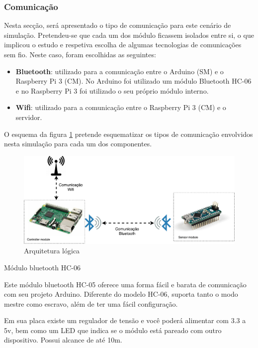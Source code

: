 \newpage
\subsubsection{Comunicação}

Nesta secção, será apresentado o tipo de comunicação para este cenário de simulação. Pretendeu-se que cada um dos módulo ficassem isolados entre si, o que implicou o estudo e respetiva escolha de algumas tecnologias de comunicações sem fio. Neste caso, foram escolhidas as seguintes: 

\begin{itemize}
	\item \textbf{Bluetooth}: utilizado para a comunicação entre o Arduino (\ac{SM}) e o Raspberry Pi 3 (\ac{CM}). No Arduino foi utilizado um módulo Bluetooth HC-06 e no Raspberry Pi 3 foi utilizado o seu próprio módulo interno. 
	\item \textbf{Wifi}: utilizado para a comunicação entre o Raspberry Pi 3 (\ac{CM}) e o servidor. 
\end{itemize}


O esquema da figura \ref{esquemcomm} pretende esquematizar os tipos de comunicação envolvidos nesta simulação para cada um dos componentes. 

\begin{figure}[!htb]
	\centering
	\includegraphics[width=\linewidth]{img/comm-blue/HW-geral.pdf}
	\caption{Arquitetura lógica}
	\label{esquemcomm}
\end{figure}




Módulo bluetooth HC-06



Este módulo bluetooth HC-05 oferece uma forma fácil e barata de comunicação com seu projeto Arduino. Diferente do modelo HC-06, suporta tanto o modo mestre como escravo, além de ter uma fácil configuração.

Em sua placa existe um regulador de tensão e você poderá alimentar com 3.3 a 5v, bem como um LED que indica se o módulo está pareado com outro dispositivo. Possui alcance de até 10m.


